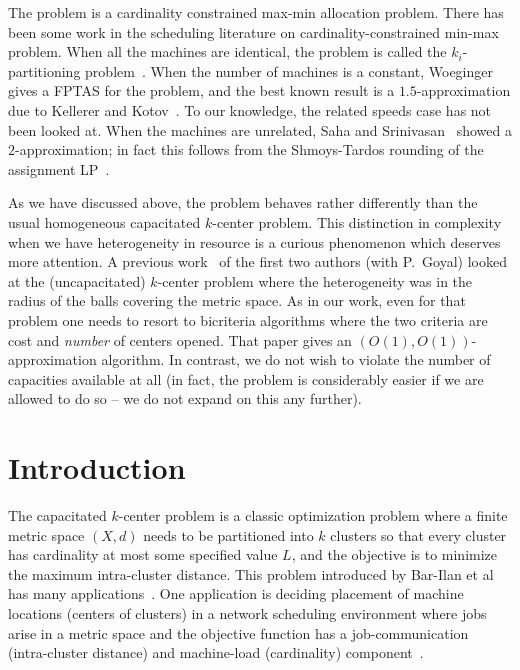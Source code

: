 The \cckp problem is a cardinality constrained max-min allocation problem. There has been some work in the scheduling literature on cardinality-constrained min-max problem.
When all the machines are identical, the problem is called the $k_i$-partitioning problem~\cite{BabelKK98}.
When the number of machines is a constant, Woeginger~\cite{Woe05} gives a FPTAS for the problem, and the best known result is a $1.5$-approximation due to Kellerer and Kotov~\cite{KellererK11}.
To our knowledge, the related speeds case has not been looked at. When the machines are unrelated,  Saha and Srinivasan~\cite{SahaS10} showed a $2$-approximation; in fact this follows from the Shmoys-Tardos rounding of the assignment LP~\cite{ShmoysT93}.\smallskip

As we have discussed above, the \mckc problem behaves rather differently than the usual homogeneous capacitated $k$-center problem. This distinction in complexity when we have heterogeneity  in resource is a curious phenomenon which deserves more attention.
A previous work~\cite{ChakrabartyGK16} of the first two authors (with P.~Goyal) looked at the (uncapacitated) $k$-center problem where the heterogeneity was in the radius of the balls covering the metric space.
As in our work, even for that problem one needs to resort to bicriteria algorithms where the two criteria are cost and {\em number} of centers opened. That paper gives an $\left(O(1),O(1)\right)$-approximation algorithm.
In contrast, we do not wish to violate the number of capacities available at all (in fact, the problem is considerably easier if we are allowed to do so -- we do not expand on this any further).









\section{Introduction}
The capacitated $k$-center problem is a classic optimization problem where a finite metric space $(X,d)$ needs to be partitioned into $k$ clusters so that  every  cluster has cardinality at most
some specified value $L$, and the objective is to minimize the maximum intra-cluster distance. This problem introduced by Bar-Ilan et al~\cite{Bar-IlanKP93} has many applications~\cite{LuptonMY98, MorganL77, Murthy1983AnAA}. %
One application is deciding placement of machine locations (centers of clusters) in a network scheduling environment where jobs arise in a metric space and the objective function has a  job-communication (intra-cluster distance) and machine-load (cardinality)
component~\cite{PSW97}. %

